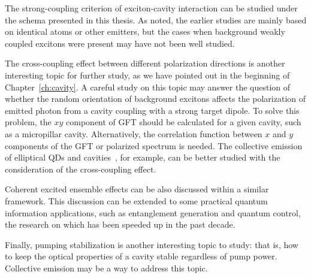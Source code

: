 The strong-coupling criterion of exciton-cavity interaction can be studied under the schema presented in this thesis. As noted, the earlier studies are mainly based on identical atoms or other emitters, but the cases when background weakly coupled excitons were present may have not been well studied.

The cross-coupling effect between different polarization directions is another interesting topic for further study, as we have pointed out in the beginning of Chapter~\ref{ch:cavity}. A careful study on this topic may answer the question of whether the random orientation of background excitons affects the polarization of emitted photon from a cavity coupling with a strong target dipole. To solve this problem, the $xy$ component of GFT should be calculated for a given cavity, such as a micropillar cavity. Alternatively, the correlation function between $x$ and $y$ components of the GFT or polarized spectrum is needed. The collective emission of elliptical QDs and cavities~\cite{Austing1999,Tokura2001,Jinxi2001,Accatino1997}, for example, can be better studied with the consideration of the cross-coupling effect.

Coherent excited ensemble effects can be also discussed within a similar framework. This discussion can be extended to some practical quantum information applications, such as entanglement generation and quantum control, the research on which has been speeded up in the past decade.

Finally, pumping stabilization is another interesting topic to study: that is, how to keep the optical properties of a cavity stable regardless of pump power. Collective emission may be a way to address this topic.


